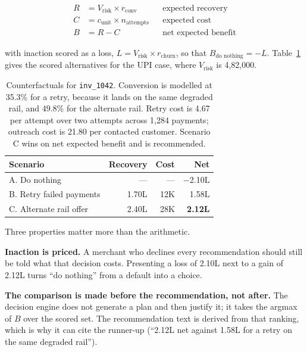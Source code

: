 \documentclass[10pt,twocolumn,a4paper]{article}
\newcommand{\rs}{\rupee}%
\newcommand{\rs}{\textrm{INR}\,}%
\newcommand{\code}[1]{\texttt{\small #1}}
\begin{document}
\[
\begin{aligned}
R &= V_{\text{risk}} \times r_{\text{conv}} &&\text{expected recovery}\\
C &= c_{\text{unit}} \times n_{\text{attempts}} &&\text{expected cost}\\
B &= R - C &&\text{net expected benefit}
\end{aligned}
\]

with inaction scored as a loss, $L = V_{\text{risk}} \times r_{\text{churn}}$,
so that $B_{\text{do nothing}} = -L$. Table~\ref{tab:scenarios} gives the scored
alternatives for the UPI case, where $V_{\text{risk}}$ is \rs{}4{,}82{,}000.

\begin{table}[h]
\centering
\small
\begin{tabular}{@{}l r r r@{}}
\toprule
\textbf{Scenario} & \textbf{Recovery} & \textbf{Cost} & \textbf{Net} \\
\midrule
A. Do nothing            & ---        & ---      & $-$\rs{}2.10L \\
B. Retry failed payments & \rs{}1.70L & \rs{}12K & \rs{}1.58L \\
C. Alternate rail offer  & \rs{}2.40L & \rs{}28K & \textbf{\rs{}2.12L} \\
\bottomrule
\end{tabular}
\caption{Counterfactuals for \code{inv\_1042}. Conversion is modelled at 35.3\%
for a retry, because it lands on the same degraded rail, and 49.8\% for the
alternate rail. Retry cost is \rs{}4.67 per attempt over two attempts across
1{,}284 payments; outreach cost is \rs{}21.80 per contacted customer. Scenario C
wins on net expected benefit and is recommended.}
\label{tab:scenarios}
\end{table}

Three properties matter more than the arithmetic.

\textbf{Inaction is priced.} A merchant who declines every recommendation should
still be told what that decision costs. Presenting a loss of \rs{}2.10L next to
a gain of \rs{}2.12L turns ``do nothing'' from a default into a choice.

\textbf{The comparison is made before the recommendation, not after.} The
decision engine does not generate a plan and then justify it; it takes the
argmax of $B$ over the scored set. The recommendation text is derived from that
ranking, which is why it can cite the runner-up (``\rs{}2.12L net against
\rs{}1.58L for a retry on the same degraded rail'').
\end{document}

